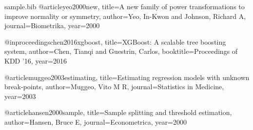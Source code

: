 \begin{filecontents*}[overwrite]{sample.bib}
@article{yeo2000new,
  title={A new family of power transformations to improve normality or symmetry},
  author={Yeo, In-Kwon and Johnson, Richard A},
  journal={Biometrika},
  year={2000}
}

@inproceedings{chen2016xgboost,
  title={XGBoost: A scalable tree boosting system},
  author={Chen, Tianqi and Guestrin, Carlos},
  booktitle={Proceedings of KDD '16},
  year={2016}
}

@article{muggeo2003estimating,
  title={Estimating regression models with unknown break-points},
  author={Muggeo, Vito M R},
  journal={Statistics in Medicine},
  year={2003}
}

@article{hansen2000sample,
  title={Sample splitting and threshold estimation},
  author={Hansen, Bruce E},
  journal={Econometrica},
  year={2000}
}
\end{filecontents*}



\documentclass[12pt,a4paper]{article}

\usepackage[paper=a4paper,
            left=35mm,
            right=35mm,
            top=30mm,
            bottom=30mm]{geometry}

\usepackage[utf8]{inputenc}
\usepackage[T1]{fontenc}
\usepackage{lmodern}
\usepackage{microtype}
\usepackage{setspace}
\usepackage{parskip}     
\usepackage{graphicx}
\graphicspath{{images/}}
\usepackage{caption}
\usepackage{subcaption}
\usepackage{booktabs}
\usepackage{amsmath,amssymb}
\usepackage{hyperref}
\usepackage{float}
\usepackage{enumitem}

\usepackage{fancyhdr}
\pagestyle{fancy}
\fancyhf{}           
\renewcommand{\headrulewidth}{0pt}   %
\renewcommand{\footrulewidth}{0pt}   %
\fancyfoot[C]{\thepage}         %


\setcounter{secnumdepth}{3}
\setcounter{tocdepth}{3}

\usepackage{setspace}
\onehalfspacing




